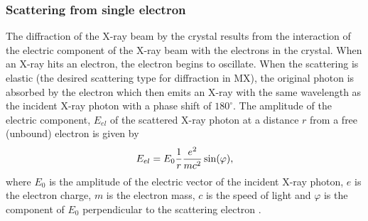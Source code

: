         \subsubsection{Scattering from single electron}
        \label{subs:Scattering from single electron}
            The diffraction of the X-ray beam by the crystal results from the interaction of the electric component of the X-ray beam with the electrons in the crystal.
            When an X-ray hits an electron, the electron begins to oscillate.
            When the scattering is elastic (the desired scattering type for diffraction in MX), the original photon is absorbed by the electron which then emits an X-ray with the same wavelength as the incident X-ray photon with a phase shift of $180^{\circ}$.
            The amplitude of the electric component, $E_{el}$ of the scattered X-ray photon at a distance $r$ from a free (unbound) electron is given by
            \begin{equation}
                E_{el} = E_0 \frac{1}{r}\frac{e^2}{mc^2} \sin(\varphi),
            \end{equation}
            where $E_0$ is the amplitude of the electric vector of the incident X-ray photon, $e$ is the electron charge, $m$ is the electron mass, $c$ is the speed of light and $\varphi$ is the component of $E_0$ perpendicular to the scattering electron \cite{drenth2012}.


